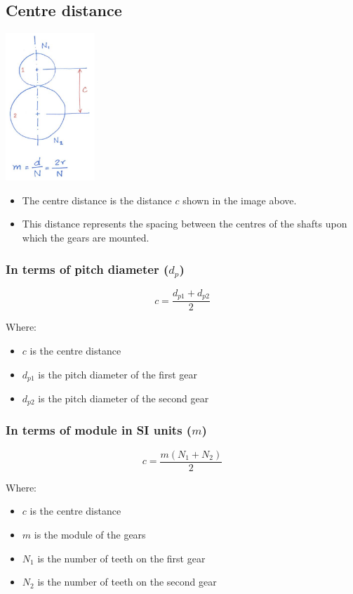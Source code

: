 \documentclass[11pt]{article}
\begin{document}
\subsection{Centre distance}
\label{sec:orge921997}
\begin{center}
\includegraphics[height=15em]{./images/centre-distance-image.png}
\end{center}
\begin{itemize}
\item The centre distance is the distance \(c\) shown in the image above.
\item This distance represents the spacing between the centres of the shafts upon which the gears are mounted.
\end{itemize}
\subsubsection{In terms of pitch diameter (\(d_p\))}
\label{sec:orgb567d69}
\[c = \frac{d_{p1} + d_{p2}}{2}\]

Where:
\begin{itemize}
\item \(c\) is the centre distance
\item \(d_{p1}\) is the pitch diameter of the first gear
\item \(d_{p2}\) is the pitch diameter of the second gear
\end{itemize}
\subsubsection{In terms of module in SI units (\(m\))}
\label{sec:orgba4558c}
\[c = \frac{m (N_1 + N_2)}{2}\]

Where:
\begin{itemize}
\item \(c\) is the centre distance
\item \(m\) is the module of the gears
\item \(N_1\) is the number of teeth on the first gear
\item \(N_2\) is the number of teeth on the second gear
\end{itemize}
\end{document}
